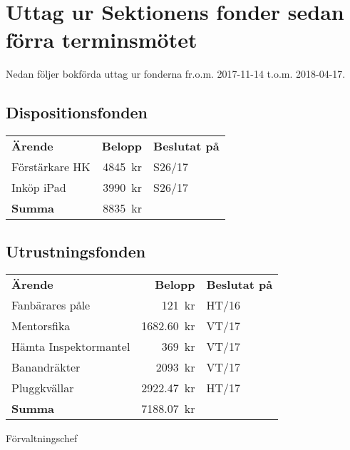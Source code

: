 \documentclass[../_main/handlingar.tex]{subfiles}
\begin{document}
\section{Uttag ur Sektionens fonder sedan förra terminsmötet}

Nedan följer bokförda uttag ur fonderna fr.o.m. 2017-11-14 t.o.m. 2018-04-17.

\subsection*{Dispositionsfonden}
\begin{tabular}{l r l}
    \textbf{Ärende} & \textbf{Belopp} & \textbf{Beslutat på} \\
    Förstärkare HK & \SI{4845}{kr}   & S26/17   \\
    Inköp iPad     & \SI{3990}{kr}   & S26/17   \\ 
    \hline
    \textbf{Summa} & \SI{8835}{kr} \\   
\end{tabular}

\subsection*{Utrustningsfonden}
\begin{tabular}{l r l}
    \textbf{Ärende} & \textbf{Belopp} & \textbf{Beslutat på} \\
          
    Fanbärares påle & \SI{121}{kr} & HT/16 \\
    Mentorsfika & \SI{1682,60}{kr} & VT/17 \\
    Hämta Inspektormantel & \SI{369}{kr} & VT/17 \\
    Banandräkter & \SI{2093}{kr} & VT/17 \\
    Pluggkvällar & \SI{2922,47}{kr} & HT/17 \\ 
    \hline
    \textbf{Summa}        & \SI{7188,07}{kr} &                     
\end{tabular}


\begin{signatures}{1}
    \ist
    \signature{\fvc}{Förvaltningschef}
\end{signatures}
\end{document}
